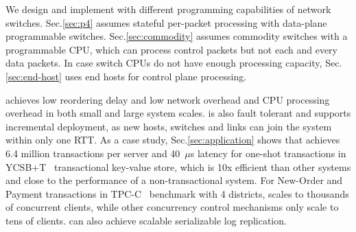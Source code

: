 

We design and implement \sys with different programming capabilities of network switches. Sec.\ref{sec:p4} assumes stateful per-packet processing with data-plane programmable switches. Sec.\ref{sec:commodity} assumes commodity switches with a programmable CPU, which can process control packets but not each and every data packets. In case switch CPUs do not have enough processing capacity, Sec.\ref{sec:end-host} uses end hosts for control plane processing.

\sys achieves low reordering delay and low network overhead and CPU processing overhead in both small and large system scales. \sys is also fault tolerant and supports incremental deployment, as new hosts, switches and links can join the system within only one RTT. As a case study, Sec.\ref{sec:application} shows that \sys achieves 6.4 million transactions per server and 40~$\mu$s latency for one-shot transactions in YCSB+T~\cite{dey2014ycsbt} transactional key-value store, which is 10x efficient than other systems and close to the performance of a non-transactional system. For New-Order and Payment transactions in TPC-C~\cite{tpcc} benchmark with 4 districts, \sys scales to thousands of concurrent clients, while other concurrency control mechanisms only scale to tens of clients. \sys can also achieve scalable serializable log replication.
